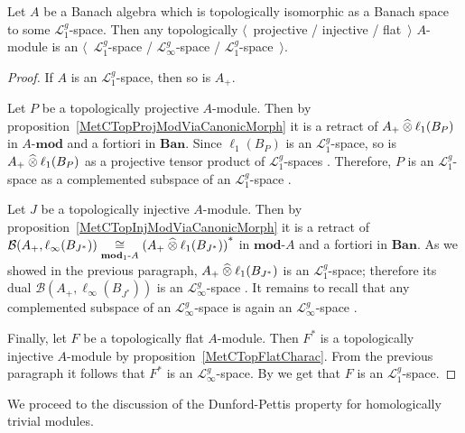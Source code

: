 \begin{proposition}\label{TopProjInjFlatModOverMthscrL1SpCharac} Let $A$ be a
Banach algebra which is topologically isomorphic as a Banach space to some
$\mathscr{L}_1^g$-space. Then any topologically $\langle$~projective / injective
/ flat~$\rangle$ $A$-module is an $\langle$~$\mathscr{L}_1^g$-space /
$\mathscr{L}_\infty^g$-space / $\mathscr{L}_1^g$-space~$\rangle$.
\end{proposition}
\begin{proof} If $A$ is an $\mathscr{L}_1^g$-space, then so is $A_+$. 

Let $P$ be a topologically projective $A$-module. Then by
proposition~\ref{MetCTopProjModViaCanonicMorph} it is a retract 
of $A_+\mathbin{\widehat{\otimes}} \ell_1(B_P)$ in $A\text{-}\mathbf{mod}$ and a fortiori 
in $\mathbf{Ban}$. Since
$\ell_1(B_P)$ is an $\mathscr{L}_1^g$-space, so is
$A_+\mathbin{\widehat{\otimes}}\ell_1(B_P)$ as a projective tensor product of
$\mathscr{L}_1^g$-spaces \cite[exercise 23.17(c)]{DefFloTensNorOpId}.
Therefore, $P$ is an $\mathscr{L}_1^g$-space as a complemented subspace of
an $\mathscr{L}_1^g$-space \cite[corollary 23.2.1(2)]{DefFloTensNorOpId}.

Let $J$ be a topologically injective $A$-module. Then by
proposition~\ref{MetCTopInjModViaCanonicMorph} it is a retract of
$\mathcal{B}(A_+,\ell_\infty(B_{J^*}))
\mathrel{\mathop{\cong}\limits_{\mathbf{mod}_1\text{-}A}}
{(A_+\mathbin{\widehat{\otimes}}\ell_1(B_{J^*}))}^*$
in $\mathbf{mod}\text{-}A$ and a fortiori in $\mathbf{Ban}$. As we showed in the
previous paragraph, $A_+\mathbin{\widehat{\otimes}}\ell_1(B_{J^*})$ is an $\mathscr{L}_1^g$-space;
therefore its dual $\mathcal{B}(A_+,\ell_\infty(B_{J^*}))$ is an
$\mathscr{L}_\infty^g$-space \cite[corollary 23.2.1(1)]{DefFloTensNorOpId}. It
remains to recall that any complemented subspace of an $\mathscr{L}_\infty^g$-space
is again an $\mathscr{L}_\infty^g$-space \cite[corollary 23.2.1(2)]{DefFloTensNorOpId}.

Finally, let $F$ be a topologically flat $A$-module. Then $F^*$ is a topologically
injective $A$-module by proposition~\ref{MetCTopFlatCharac}. From the previous
paragraph it follows that $F^*$ is an $\mathscr{L}_\infty^g$-space. By
\cite[corollary 23.5(1)]{DefFloTensNorOpId} we get that $F$ is an
$\mathscr{L}_1^g$-space.
\end{proof}

We proceed to the discussion of the Dunford-Pettis property for homologically
trivial modules.   

